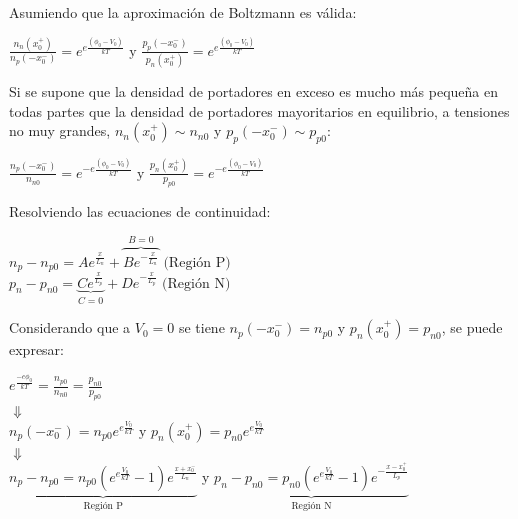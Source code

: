 \documentclass[oneside]{book}
\numberwithin{equation}{section}
\numberwithin{figure}{section}
\numberwithin{table}{section}
\begin{document}
				Asumiendo que la aproximación de Boltzmann es válida:
				
				\begin{center}
					$\displaystyle \frac{n_n(x_0^+)}{n_p(-x_0^-)}=e^{e\frac{(\phi_0-V_0)}{kT}} \text{  y  } \frac{p_p(-x_0^-)}{p_n(x_0^+)}=e^{e\frac{(\phi_0-V_0)}{kT}}$
				\end{center}
				
				Si se supone que la densidad de portadores en exceso es mucho más pequeña en todas partes que la densidad de portadores mayoritarios en equilibrio, a tensiones no muy grandes, $n_n(x_0^+) \sim n_{n0}$ y $p_p(-x_0^-) \sim p_{p0}$:\\
				
				\begin{center}
					$\displaystyle \frac{n_p(-x_0^-)}{n_{n0}}=e^{-e\frac{(\phi_0-V_0)}{kT}} \text{  y  } \frac{p_n(x_0^+)}{p_{p0}}=e^{-e\frac{(\phi_0-V_0)}{kT}}$
				\end{center}
				
				Resolviendo las ecuaciones de continuidad:
				
				\begin{center}
					$\displaystyle n_p-n_{p0}=A e^{\frac{x}{L_n}}+\overbrace{B e^{-\frac{x}{L_n}}}^{B=0} \text{  (Región P)  }$\\
					
					$\displaystyle p_n-p_{n0}=\underbrace{C e^{\frac{x}{L_p}}}_{C=0}+D e^{-\frac{x}{L_p}} \text{  (Región N)  }$\\
				\end{center}
		
				Considerando que a $V_0=0$ se tiene $n_p(-x_0^-)=n_{p0}$ y $p_n(x_0^+)=p_{n0}$, se puede expresar:
				
				\begin{center}
					$\displaystyle e^{\frac{-e\phi_0}{kT}}=\frac{n_{p0}}{n_{n0}}=\frac{p_{n0}}{p_{p0}}$\\
					$\Downarrow$\\
					$\displaystyle n_p(-x_0^-)=n_{p0} e^{e\frac{V_0}{kT}} \text{ y } p_n(x_0^+)=p_{n0} e^{e\frac{V_0}{kT}}$\\
					$\Downarrow$\\
					$\underbrace{\boxed{\displaystyle n_p-n_{p0}=n_{p0} \left( e^{e\frac{V_0}{kT}}-1\right)e^{\frac{x+x_0^-}{L_n}}}}_{\text{Región P}}$ y $\underbrace{\boxed{\displaystyle p_n-p_{n0}=p_{n0} \left( e^{e\frac{V_0}{kT}}-1\right)e^{-\frac{x-x_0^+}{L_p}}}}_{\text{Región N}}$\\
				\end{center}
		
\end{document}

